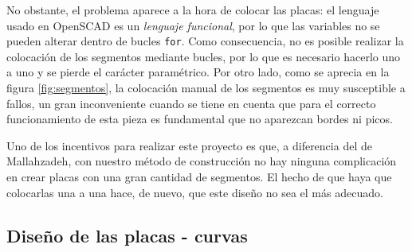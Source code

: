 \documentclass[11pt,a4paper,twoside,pdf]{article}
\numberwithin{equation}{section}
\begin{document}
No obstante, el problema aparece a la hora de colocar las placas: el lenguaje usado en OpenSCAD es un \textit{lenguaje funcional}, por lo que las variables no se pueden alterar dentro de bucles \texttt{for}. Como consecuencia, no es posible realizar la colocación de los segmentos mediante bucles, por lo que es necesario hacerlo uno a uno y se pierde el carácter paramétrico. Por otro lado, como se aprecia en la figura \ref{fig:segmentos}, la colocación manual de los segmentos es muy susceptible a fallos, un gran inconveniente cuando se tiene en cuenta que para el correcto funcionamiento de esta pieza es fundamental que no aparezcan bordes ni picos. 

Uno de los incentivos para realizar este proyecto es que, a diferencia del de Mallahzadeh, con nuestro método de construcción no hay ninguna complicación en crear placas con una gran cantidad de segmentos. El hecho de que haya que colocarlas una a una hace, de nuevo, que este diseño no sea el más adecuado.

\subsection{Diseño de las placas - curvas}
\end{document}
